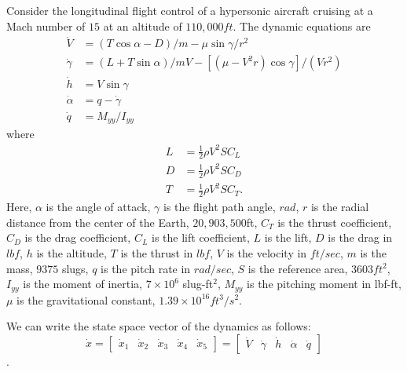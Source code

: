 \begin{example}
	Consider the longitudinal flight control of a hypersonic aircraft cruising at a Mach number of $15$ at an altitude of $110,000ft$. The dynamic equations are \cite{StengelHypersonic}
	\begin{subequations}
		\begin{align}
			\dot{V} &= \left(T \cos \alpha - D\right)/m - \mu \sin \gamma / r^2  \\
			\dot{\gamma} &= \left(L + T \sin \alpha\right)/mV - \left[(\mu - V^2 r) \cos \gamma\right]/(Vr^2) \\
			\dot{h} &= V \sin \gamma \\
			\dot{\alpha} &= q - \dot{\gamma} \\
			\dot{q} &= M_{yy} / I_{yy}
		\end{align}
	\label{eq:hypersonic_dyn}
	\end{subequations}
where
%
\begin{subequations}
	\begin{align}
		L &= \frac{1}{2} \rho V^2 S C_L \\
		D &= \frac{1}{2} \rho V^2 S C_D \\
		T &= \frac{1}{2} \rho V^2 S C_T.
	\end{align}
\end{subequations}
%
Here, $\alpha$ is the angle of attack, $\gamma$ is the flight path angle, $rad$, $r$ is the radial distance from the center of the Earth, $20,903,500$ft, $C_T$ is the thrust coefficient, $C_D$ is the drag coefficient, $C_L$ is the lift coefficient, $L$ is the lift, $D$ is the drag in $lbf$, $h$ is the altitude, $T$ is the thrust in $lbf$, $V$ is the velocity in $ft/sec$, $m$ is the mass, $9375$ slugs, $q$ is the pitch rate in $rad/sec$, $S$ is the reference area, $3603 ft^2$, $I_{yy}$ is the moment of inertia, $7 \times 10^6$ slug-ft$^2$, $M_{yy}$ is the pitching moment in lbf-ft, $\mu$ is the gravitational constant, $1.39 \times 10^16 ft^3/s^2$.

We can write the state space vector of the dynamics as follows:
\[
	\dot{x} = \begin{bmatrix}
				\dot{x}_1 & \dot{x}_2 & \dot{x}_3 & \dot{x}_4 & \dot{x}_5
	\end{bmatrix} = \begin{bmatrix}
	\dot{V} & \dot{\gamma} & \dot{h} & \dot{\alpha} & \dot{q}
\end{bmatrix}
\].


\end{example}

